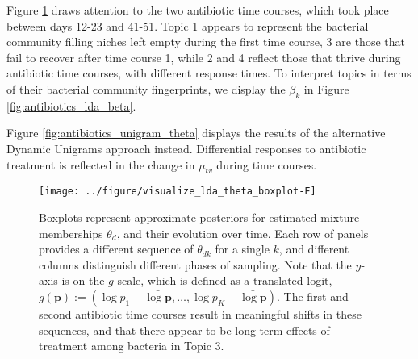 \documentclass[final]{beamer}
\newlength{\onecolwid}
\begin{document}
\begin{frame}
\begin{columns}
\begin{column}{\onecolwid}

\begin{block}{}
Figure \ref{fig:antibiotics_lda_theta} draws attention to the two antibiotic
time courses, which took place between days 12-23 and 41-51. Topic 1 appears to
represent the bacterial community filling niches left empty during the first
time course, 3 are those that fail to recover after time course 1, while 2 and 4
reflect those that thrive during antibiotic time courses, with different
response times. To interpret topics in terms of their bacterial community
fingerprints, we display the $\beta_{k}$ in Figure
\ref{fig:antibiotics_lda_beta}.

Figure \ref{fig:antibiotics_unigram_theta} displays the results of the
alternative Dynamic Unigrams approach instead. Differential responses to
antibiotic treatment is reflected in the change in $\mu_{tv}$ during time
courses.

\end{block}

\begin{figure}[!p]
  \centering\texttt{[image: ../figure/visualize\_lda\_theta\_boxplot-F]}
  \caption{Boxplots represent approximate posteriors for estimated mixture
    memberships $\theta_{d}$, and their evolution over time. Each row of panels
    provides a different sequence of $\theta_{dk}$ for a single $k$, and
    different columns distinguish different phases of sampling. Note that the
    $y$-axis is on the $g$-scale, which is defined as a translated logit,
    $g\left(\mathbf{p}\right) := \left(\log p_{1} - \bar{\log \mathbf{p}},
    \dots,\log p_{K} - \bar{\log \mathbf{p}}\right)$. The first and second
    antibiotic time courses result in meaningful shifts in these sequences, and
    that there appear to be long-term effects of treatment among bacteria in
    Topic 3. \label{fig:antibiotics_lda_theta}}
\end{figure}



\end{column}
\end{columns}
\end{frame}
\end{document}
